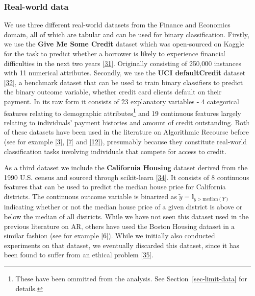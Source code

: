 \documentclass[
  conference]{IEEEtran}
\begin{document}
\hypertarget{real-world-data}{%
\subsubsection{Real-world data}\label{real-world-data}}

We use three different real-world datasets from the Finance and
Economics domain, all of which are tabular and can be used for binary
classification. Firstly, we use the \textbf{Give Me Some Credit} dataset
which was open-sourced on Kaggle for the task to predict whether a
borrower is likely to experience financial difficulties in the next two
years \protect\hyperlink{ref-gmsc_data}{{[}31{]}}. Originally consisting
of 250,000 instances with 11 numerical attributes. Secondly, we use the
\textbf{UCI defaultCredit} dataset
\protect\hyperlink{ref-yeh2009comparisons}{{[}32{]}}, a benchmark
dataset that can be used to train binary classifiers to predict the
binary outcome variable, whether credit card clients default on their
payment. In its raw form it consists of 23 explanatory variables - 4
categorical features relating to demographic attributes\footnote{These
  have been ommitted from the analysis. See Section~\ref{sec-limit-data}
  for details.} and 19 continuous features largely relating to
individuals' payment histories and amount of credit outstanding. Both of
these datasets have been used in the literature on Algorithmic Recourse
before (see for example
\protect\hyperlink{ref-pawelczyk2021carla}{{[}3{]}},
\protect\hyperlink{ref-joshi2019towards}{{[}7{]}} and
\protect\hyperlink{ref-ustun2019actionable}{{[}12{]}}), presumably
because they constitute real-world classification tasks involving
individuals that compete for access to credit.

As a third dataset we include the \textbf{California Housing} dataset
derived from the 1990 U.S. census and sourced through scikit-learn
\protect\hyperlink{ref-pace1997sparse}{{[}34{]}}. It consists of 8
continuous features that can be used to predict the median house price
for California districts. The continuous outcome variable is binarized
as \(\tilde{y}=\mathbb{I}_{y>\text{median}(Y)}\) indicating whether or
not the median house price of a given district is above or below the
median of all districts. While we have not seen this dataset used in the
previous literature on AR, others have used the Boston Housing dataset
in a similar fashion (see for example
\protect\hyperlink{ref-schut2021generating}{{[}6{]}}). While we
initially also conducted experiments on that dataset, we eventually
discarded this dataset, since it has been found to suffer from an
ethical problem \protect\hyperlink{ref-carlisle2019racist}{{[}35{]}}.
\end{document}

